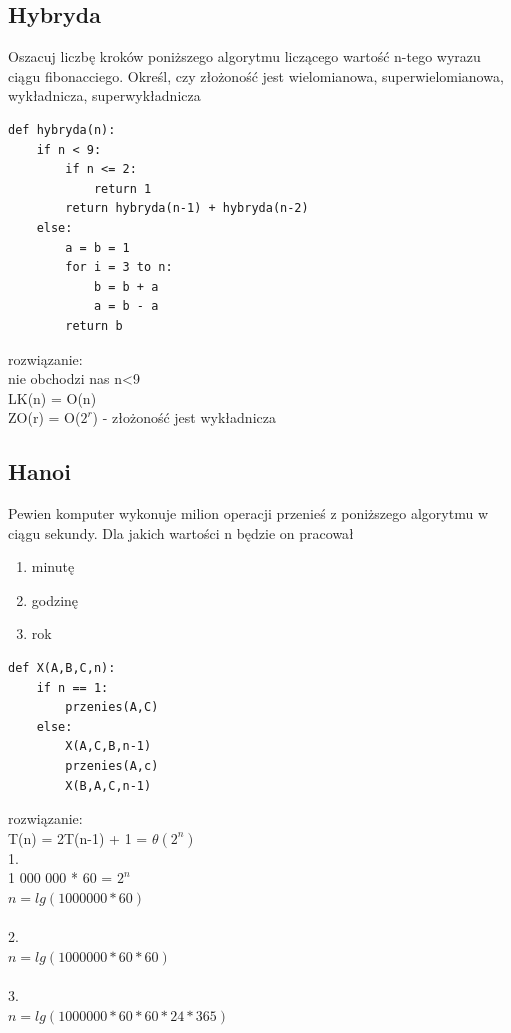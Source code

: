 \documentclass{article}
\begin{document}
\subsection*{Hybryda}

Oszacuj liczbę kroków poniższego algorytmu liczącego wartość n-tego wyrazu ciągu fibonacciego. 
Określ, czy złożoność jest wielomianowa, superwielomianowa,  wykładnicza, superwykładnicza
\begin{lstlisting}
def hybryda(n):
	if n < 9:
		if n <= 2:
			return 1
		return hybryda(n-1) + hybryda(n-2)
	else:
		a = b = 1
		for i = 3 to n:
			b = b + a
			a = b - a
		return b
\end{lstlisting}
rozwiązanie: \\
nie obchodzi nas n<9 \\
LK(n) = O(n) \\
ZO(r) = O($2^r$) - złożoność jest wykładnicza


\subsection*{Hanoi}
Pewien komputer wykonuje milion operacji przenieś z poniższego algorytmu w ciągu sekundy. Dla jakich wartości n będzie on pracował
\begin{enumerate}
	\item minutę
	\item godzinę
	\item rok
\end{enumerate}
\begin{lstlisting}
def X(A,B,C,n):
	if n == 1:
		przenies(A,C)
	else:
		X(A,C,B,n-1)
		przenies(A,c)
		X(B,A,C,n-1)
\end{lstlisting}
rozwiązanie: \\
T(n) = 2T(n-1) + 1 = $\theta(2^n)$ \\
1. \\
1 000 000 * 60 = $2^n$ \\
$n = lg(1 000 000 * 60)$ \\\\
2.\\
$n = lg(1 000 000 * 60 * 60)$ \\\\
3.\\
$n = lg(1 000 000 * 60 * 60 * 24 * 365)$ 
\end{document}
